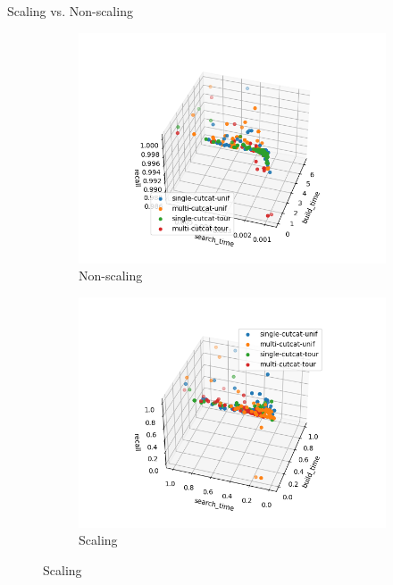 \begin{frame}{Scaling vs. Non-scaling}
    \begin{figure}
        \centering
        \hfill
        \begin{subfigure}{0.49\textwidth}
            \includegraphics[width=\textwidth]{../images/report/non-scaling.png}
            \caption{Non-scaling}
        \end{subfigure}
        \hfill
        \begin{subfigure}{0.49\textwidth}
            \includegraphics[width=\textwidth]{../images/report/scaling.png}
            \caption{Scaling}
        \end{subfigure}
    \end{figure}
\end{frame}
